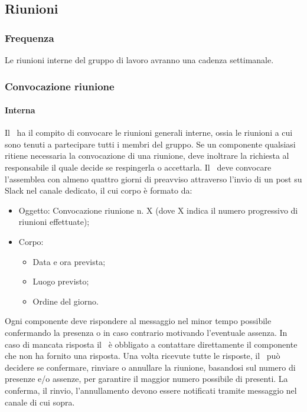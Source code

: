 \documentclass[../NormeDiProgetto.tex]{subfiles}
\begin{document}
			\subsection{Riunioni}
				\subsubsection{Frequenza}
					Le riunioni interne del gruppo di lavoro avranno una cadenza settimanale.
				\subsubsection{Convocazione riunione}
					\paragraph{Interna\\}
						Il \responsabilediprogetto\ ha il compito di convocare le riunioni generali
						interne, ossia le riunioni a cui sono tenuti a partecipare tutti i membri
						del gruppo. Se un componente qualsiasi ritiene necessaria la convocazione di una
						riunione, deve inoltrare la richiesta al responsabile il quale decide se respingerla
						o accettarla. Il \responsabilediprogetto\ deve convocare l'assemblea con almeno
						quattro giorni di preavviso attraverso l'invio di un post su Slack nel canale
						dedicato, il cui corpo è formato da:
						\begin{itemize}
							\item Oggetto: Convocazione riunione n. X (dove X indica il numero progressivo
							di riunioni effettuate);
							\item Corpo:
							\begin{itemize}
								\item Data e ora prevista;
								\item Luogo previsto;
								\item Ordine del giorno.
							\end{itemize}
						\end{itemize}
						Ogni componente deve rispondere al messaggio nel minor tempo possibile confermando
						la presenza o in caso contrario motivando l'eventuale assenza.
						In caso di mancata risposta il \responsabilediprogetto\ è obbligato a contattare
						direttamente il componente che non ha fornito una risposta.
						Una volta ricevute tutte le risposte, il \responsabilediprogetto\
						può decidere se confermare, rinviare o annullare la riunione, basandosi sul numero di
						presenze e/o assenze, per garantire il maggior numero possibile di presenti.
						La conferma, il rinvio, l'annullamento devono essere notificati tramite messaggio
						nel canale di cui sopra.
\end{document}

